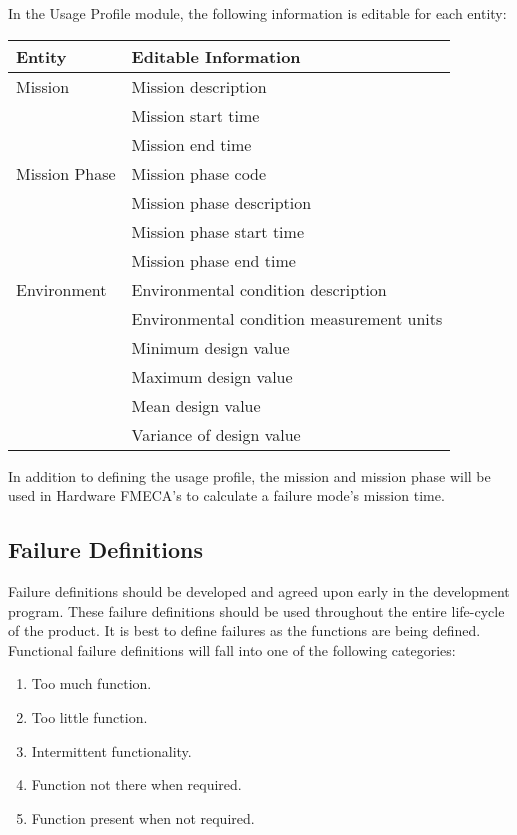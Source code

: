 \documentclass[twoside,12pt,letterpaper,openright]{book}
\begin{document}
\medskip
\noindent In the Usage Profile module, the following information is editable
for each entity:
\\

\begin{tabular}{l | l}
    \hline \hline
    \textbf{Entity} & \textbf{Editable Information} \\
    \hline
    Mission & Mission description \\
            & Mission start time \\
            & Mission end time \\
    \cline{2-2}
    Mission Phase & Mission phase code \\
                  & Mission phase description \\
                  & Mission phase start time \\
                  & Mission phase end time \\
    \cline{2-2}
    Environment & Environmental condition description \\
                & Environmental condition measurement units \\
                & Minimum design value \\
                & Maximum design value \\
                & Mean design value \\
                & Variance of design value \\
    \hline
\end{tabular}

\medskip
\noindent In addition to defining the usage profile, the mission and mission
phase will be used in Hardware FMECA's to calculate a failure mode's mission
time.

\subsection{Failure Definitions}

\noindent Failure definitions should be developed and agreed upon early in the
development program.  These failure definitions should be used throughout the
entire life-cycle of the product.  It is best to define failures as the
functions are being defined.  Functional failure definitions will fall into one
of the following categories:

\begin{enumerate}
    \item Too much function.
    \item Too little function.
    \item Intermittent functionality.
    \item Function not there when required.
    \item Function present when not required.
\end{enumerate}
\end{document}
